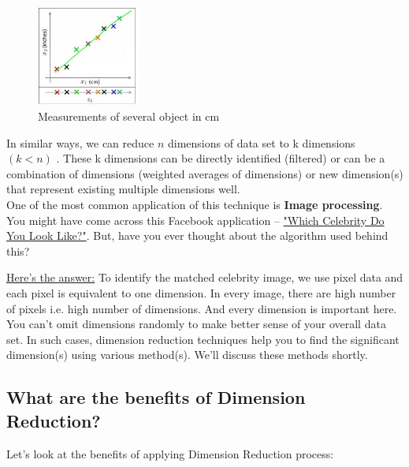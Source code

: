 \documentclass[12pt]{article}
\theoremstyle{plain}
\begin{document}
\begin{figure}[h!]
 \begin{center}
  \includegraphics[width=0.3\textwidth]{media/2D_1D.png}
  \caption{Measurements of several object in cm}  
\label{fig:ss}
 \end{center}

\end{figure}

In similar ways, we can reduce $n$ dimensions of data set to k dimensions $(k < n)$ . These k dimensions can be directly identified (filtered) or can be a combination of dimensions (weighted averages of dimensions) or new dimension(s) that represent existing multiple dimensions well.
\\

One of the most common application of this technique is \textbf{Image processing}. You might have come across this Facebook application – \underline{"Which Celebrity Do You Look Like?"}. But, have you ever thought about the algorithm used behind this?

\underline{Here's the answer:} To identify the matched celebrity image, we use pixel data and each pixel is equivalent to one dimension. In every image, there are high number of pixels i.e. high number of dimensions. And every dimension is important here. You can’t omit dimensions randomly to make better sense of your overall data set. In such cases, dimension reduction techniques help you to find the significant dimension(s) using various method(s). We’ll discuss these methods shortly.

\subsection{What are the benefits of Dimension Reduction?}

Let’s look at the benefits of applying Dimension Reduction process:
\end{document}
